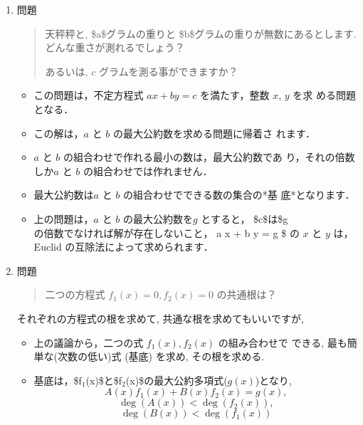 \documentclass[a4j,12pt]{jarticle}
\begin{document}
\begin{enumerate}
\item 問題
\label{sec:org082efde}

\begin{quote}
天秤秤と, \$a\$グラムの重りと \$b\$グラムの重りが無数にあるとします.
どんな重さが測れるでしょう？

あるいは, \(c\) グラムを測る事ができますか？
\end{quote}

\begin{itemize}
\item この問題は，不定方程式 \(a x + b y = c\) を満たす，整数 \(x\), \(y\) を求
める問題となる．

\item この解は，\(a\) と \(b\) の最大公約数を求める問題に帰着さ れます．

\item \(a\) と \(b\) の組合わせで作れる最小の数は，最大公約数であ
り，それの倍数しか\(a\) と \(b\) の組合わせでは作れません．

\item 最大公約数は\(a\) と \(b\) の組合わせでできる数の集合の*基
底*となります．

\item 上の問題は，\(a\) と \(b\) の最大公約数を\(g\) とすると，
\$c\$は\$g\(の倍数でなければ解が存在しないこと，\) a x + b y = g \$
の \(x\) と \(y\) は，Euclid の互除法によって求められます．
\end{itemize}

\item 問題
\label{sec:org1f08fc5}

\begin{quote}
二つの方程式 \(f_1(x)=0, f_2(x)=0\) の共通根は？
\end{quote}

それぞれの方程式の根を求めて, 共通な根を求めてもいいですが,

\begin{itemize}
\item 上の議論から，二つの式 \(f_1(x), f_2(x)\) の組み合わせで できる,
最も簡単な(次数の低い)式 (基底) を求め, その根を求める.

\item 基底は，\$f\(_{\text{1}}\)(x)\$と\$f\(_{\text{2}}\)(x)\$の最大公約多項式(\(g(x)\))となり,
$$A(x) f_1(x) + B(x) f_2(x) = g(x),$$ $$\deg(A(x)) < \deg(f_2(x)),$$
$$\deg(B(x)) < \deg(f_1(x))$$
\end{itemize}
\end{enumerate}
\end{document}

